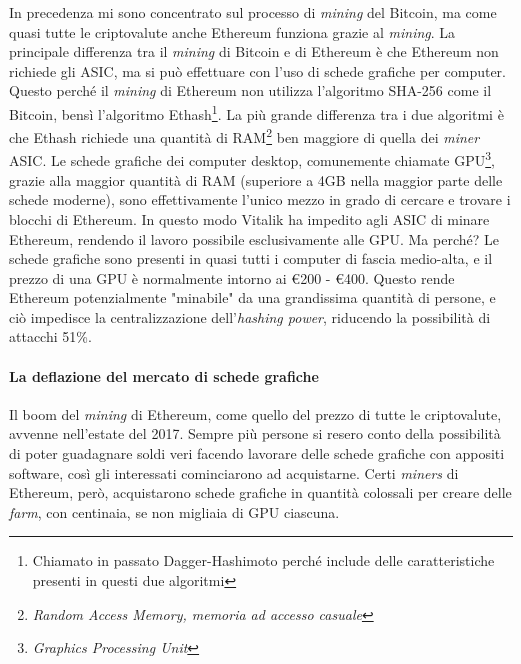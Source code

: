 \documentclass {article}
\begin{document}
In precedenza mi sono concentrato sul processo di \textit{mining} del Bitcoin, ma come quasi tutte le criptovalute anche Ethereum funziona grazie al \textit{mining}.
La principale differenza tra il \textit{mining} di Bitcoin e di Ethereum è che Ethereum non richiede gli ASIC, ma si può effettuare con l'uso di schede grafiche per computer.
Questo perché il \textit{mining} di Ethereum non utilizza l'algoritmo SHA-256 come il Bitcoin, bensì l'algoritmo Ethash\footnote{Chiamato in passato Dagger-Hashimoto perché include delle caratteristiche presenti in questi due algoritmi}.
La più grande differenza tra i due algoritmi è che Ethash richiede una quantità di RAM\footnote{\textit{Random Access Memory, memoria ad accesso casuale}} ben maggiore di quella dei \textit{miner} ASIC.
Le schede grafiche dei computer desktop, comunemente chiamate GPU\footnote{\textit{Graphics Processing Unit}}, grazie alla maggior quantità di RAM (superiore a 4GB nella maggior parte delle schede moderne), sono effettivamente l'unico mezzo in grado di cercare e trovare i blocchi di Ethereum.
In questo modo Vitalik ha impedito agli ASIC di minare Ethereum, rendendo il lavoro possibile esclusivamente alle GPU. Ma perché?
Le schede grafiche sono presenti in quasi tutti i computer di fascia medio-alta, e il prezzo di una GPU è normalmente intorno ai \euro{200} - \euro{400}.
Questo rende Ethereum potenzialmente "minabile" da una grandissima quantità di persone, e ciò impedisce la centralizzazione dell'\textit{hashing power}, riducendo la possibilità di attacchi 51\%.

\paragraph {La deflazione del mercato di schede grafiche}

Il boom del \textit{mining} di Ethereum, come quello del prezzo di tutte le criptovalute, avvenne nell'estate del 2017.
Sempre più persone si resero conto della possibilità di poter guadagnare soldi veri facendo lavorare delle schede grafiche con appositi software, così gli interessati cominciarono ad acquistarne.
Certi \textit{miners} di Ethereum, però, acquistarono schede grafiche in quantità colossali per creare delle \textit{farm}, con centinaia, se non migliaia di GPU ciascuna.
\end{document}
